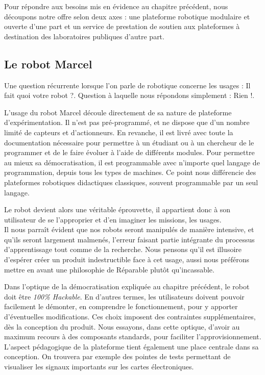 \documentclass[a4paper,12pt]{report}
\begin{document}
Pour répondre aux besoins mis en évidence au chapitre précédent, nous découpons notre offre selon deux axes :
une plateforme robotique modulaire et ouverte d'une part et un service de prestation de soutien aux plateformes à destination des laboratoires publiques d'autre part.
\subsection{Le robot Marcel}
Une question récurrente lorsque l'on parle de robotique concerne les usages : \og{}Il fait quoi votre robot ?\fg{}.
Question à laquelle nous répondons simplement : \og{}Rien !\fg{}.

L'usage du robot Marcel découle directement de sa nature de plateforme d'expérimentation.
Il n'est pas pré-programmé, et ne dispose que d'un nombre limité de capteurs et d'actionneurs.
En revanche, il est livré avec toute la documentation nécessaire pour permettre à un étudiant ou à un chercheur de le programmer et de le faire évoluer à l'aide de différents modules.
Pour permettre au mieux sa démocratisation, il est programmable avec n'importe quel langage de programmation, depuis tous les types de machines.
Ce point nous différencie des plateformes robotiques didactiques classiques, souvent programmable par un seul langage.

Le robot devient alors une véritable éprouvette, il appartient donc à son utilisateur de se l'approprier et d'en imaginer les missions, les usages.\\

Il nous parraît évident que nos robots seront manipulés de manière intensive, et qu'ils seront largement malmenés, 
l'erreur faisant partie intégrante du processus d'apprentissage tout comme de la recherche.
Nous pensons qu'il est illusoire d'espérer créer un produit indestructible face à cet usage, aussi nous préférons mettre en avant une philosophie de \og{}Réparable plutôt qu'incassable\fg{}.

Dans l'optique de la démocratisation expliquée au chapitre précédent, le robot doit être \emph{100\% Hackable}.
En d'autres termes, les utilisateurs doivent pouvoir facilement le démonter, en comprendre le fonctionnement, pour y apporter d'éventuelles modifications.
Ces choix imposent des contraintes supplémentaires, dès la conception du produit.
Nous essayons, dans cette optique, d'avoir au maximum recours à des composants standards, pour faciliter l'approvisionnement.
L'aspect pédagogique de la plateforme tient également une place centrale dans sa conception.
On trouvera par exemple des pointes de tests permettant de visualiser les signaux importants sur les cartes électroniques.\\
\end{document}
